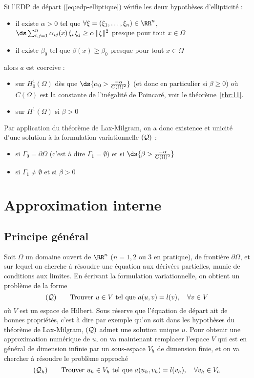 %
Si l'EDP de départ (\ref{eq:edp-elliptique}) vérifie les deux hypothèses d'ellipticité :
\begin{itemize}
\item il existe $\alpha >0$ tel que $\forall \xi=(\xi_1, \ldots , \xi_n)\in\RR^n$, $ {\ds \sum_{i,j=1}^n  \alpha_{ij}(x) \, \xi_i \, \xi_j  \ge \alpha \, \| \xi \|^2 }$ presque pour tout $x\in\Omega$
%
\item il existe $\beta_0$ tel que $\beta(x) \ge \beta_0$ presque pour tout $x\in\Omega$\\
\end{itemize}
%
alors $a$ est coercive :
\begin{itemize}
\item sur $H^1_0(\Omega)$ dès que $\ds{\alpha_0 >
  \frac{-\alpha}{C(\Omega)^2}}$ (et donc en particulier si $\beta\ge 0$) où
  $C(\Omega)$ est la constante de l'inégalité de Poincaré, voir le
  théorème~\ref{thr:11}.
\item sur $H^1(\Omega)$ si $\beta > 0$\\
\end{itemize}
%
%
Par application du théorème de Lax-Milgram, on a donc existence et unicité
d'une solution \`a la formulation variationnelle $({\cal Q})$ :
\begin{itemize}
\item  si $\Gamma_0 = \partial\Omega$ (c'est \`a dire $\Gamma_1=\emptyset$) et si  $\ds{\beta > \frac{-\alpha}{C(\Omega)^2}}$
%
\item si $\Gamma_1\ne \emptyset$ et si $\beta > 0$
\end{itemize}
%
%
%
\section{Approximation interne}
%
\subsection{Principe général}
%
\noindent
Soit $\Omega$ un domaine ouvert de $\RR^n$ ($n=1,2$ ou 3 en pratique), de
frontière $\partial\Omega$, et sur lequel on cherche \`a résoudre une
équation aux dérivées partielles, munie de conditions aux limites. En
écrivant la formulation variationnelle, on obtient un problème de la forme
%
$$
({\cal Q})\qquad \hbox{Trouver } u\in V \hbox{ tel que } a(u,v)=l(v), \quad\forall v\in V
$$
où $V$ est un espace de Hilbert. Sous réserve que l'équation de départ
ait de bonnes propriétés, c'est \`a dire par exemple qu'on soit dans les
hypothèses du théorème de Lax-Milgram, $({\cal Q})$ admet une solution
unique $u$.  Pour obtenir une approximation numérique de $u$, on va
maintenant remplacer l'espace $V$ qui est en général de dimension infinie
par un sous-espace $V_h$ de dimension finie, et on va chercher \`a résoudre
le problème approché
%
\begin{equation}
  \label{eq:6}
  ({\cal Q}_h)\qquad \hbox{Trouver } u_h\in V_h \hbox{ tel que } a(u_h,v_h)=l(v_h), \quad\forall v_h\in V_h
\end{equation}

